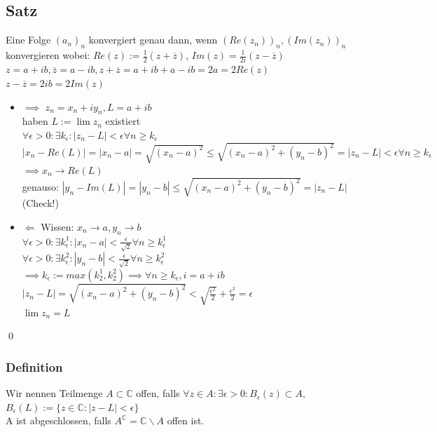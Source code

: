\documentclass[fleqn]{scrbook}
\newcommand{\qq}[1]{\glqq #1\grqq}
\renewenvironment{proof}{{\bfseries Beweis }}{\qed}
\begin{document}
\subsection{Satz} Eine Folge $(a_n)_n$ konvergiert genau dann, wenn $(Re(z_n))_n, (Im(z_n))_n$ konvergieren wobei: $Re(z):=\frac{1}{2}(z + \overline{z})$, $Im(z) = \frac{1}{2i}(z - \overline{z})$\\
$z = a + ib, \overline{z} = a - ib, z + \overline{z} = a + ib + a - ib = 2a = 2Re(z)$\\
$z-\overline{z} = 2ib = 2Im(z)$\\
\begin{proof}
\begin{itemize}
\item \qq{$\implies$} $z_n = x_n + iy_n, L = a + ib$\\
haben $L:= \lim z_n$ existiert\\
$\forall \epsilon > 0:\exists k_\epsilon: |z_n - L| < \epsilon \forall n \geq k_\epsilon$\\
$|x_n - Re(L)| = |x_n -a| = \sqrt{(x_n - a)^2} \leq \sqrt{(x_n - a)^2 + (y_n -b)^2} = |z_n - L| < \epsilon \forall n\geq k_\epsilon$\\
$\implies x_n \rightarrow Re(L)$\\
genauso: $|y_n - Im(L)| = |y_n - b| \leq \sqrt{(x_n - a)^2 + (y_n - b)^2} = |z_n - L|$ (Check!)
\item \qq{$\Leftarrow$} Wissen: $x_n \rightarrow a, y_n \rightarrow b$\\
$\forall \epsilon > 0: \exists k^1_\epsilon :|x_n -a | < \frac{\epsilon}{\sqrt{2}} \forall n \geq k^1_\epsilon$\\
$\forall \epsilon > 0: \exists k^2_\epsilon :|y_n - b| < \frac{\epsilon}{\sqrt{2}} \forall n \geq k^2_\epsilon$\\
$\implies k_\epsilon := max(k^1_2, k^2_2) \implies \forall n \geq k_\epsilon, i = a + ib$\\
$|z_n - L| = \sqrt{(x_n-a)^2 + (y_n - b)^2} < \sqrt{\frac{\epsilon^2}{2}} + \frac{\epsilon^2}{2} = \epsilon$\\
$\lim z_n = L$
\end{itemize}
\end{proof}
\subsubsection{Definition} Wir nennen Teilmenge $A \subset \mathbb{C}$ offen, falls $\forall z \in A: \exists \epsilon > 0 :B_\epsilon(z) \subset A$, $B_\epsilon(L):=\{z \in \mathbb{C}: |z-L|<\epsilon \}$\\
A ist abgeschlossen, falls $A^\mathbb{C} = \mathbb{C} \backslash A$ offen ist.
\end{document}
